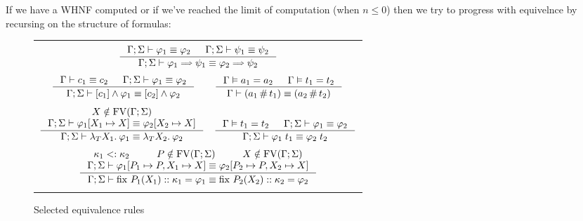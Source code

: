 \documentclass[english, mgr]{iithesis}
\newcommand{\fix}[3]{\ensuremath{\text{fix }#1(#2)\ofkind#3=}}\newcommand{\myatop}[2]{\ensuremath{\genfrac{}{}{0pt}{}{#1\hfill}{#2\hfill}}}
\begin{document}
\newpage

If we have a WHNF computed or if we've reached the limit of computation (when $ n \leqslant 0$) then we try to progress with equivelnce by recursing on the structure of formulas:
\begin{figure}[htbp]
  \centering
\begin{tabularx}{\textwidth}{|C|}
\hline \\ $
  \inference{
    \jgmnt[\Gamma; \Sigma]{\formphi_1 \equiv \formphi_2 } &
    \jgmnt[\Gamma; \Sigma]{\psi_1 \equiv \psi_2 }
    }{
    \jgmnt[\Gamma; \Sigma]{\formphi_1 \fImp \psi_1 \equiv \formphi_2 \fImp \psi_2 }
  }
$ \\ \\ $
  \inference{
    \jgmnt[\Gamma]{\constr_1 \equiv \constr_2 } &
    \jgmnt[\Gamma; \Sigma]{\formphi_1 \equiv \formphi_2 }
  }{
    \jgmnt[\Gamma; \Sigma]{\fCAnd{\constr_1}\formphi_1 \equiv \fCAnd{\constr_2}\formphi_2 }
  }
\qquad
  \inference{
    \cjgmnt[\Gamma]{\atomv_1 \ceq \atomv_2 } & \cjgmnt[\Gamma]{\term_1 \ceq \term_2 }
  }{
    \jgmnt[\Gamma]{(\atomv_1 \cfresh \term_1) \equiv (\atomv_2 \cfresh \term_2) }
  }
$ \\ \\ $
  \inference{
    \termv \notin \fv[\Gamma; \Sigma] \\
    \jgmnt[\Gamma; \Sigma]{\formphi_1[\termv_1 \mapsto \termv] \equiv \formphi_2[\termv_2 \mapsto \termv] }
    }{
    \jgmnt[\Gamma; \Sigma]{\fLamTerm{\termv_1}\formphi_1 \equiv \fLamTerm{\termv_2}\formphi_2 }
  }
  \quad
  \inference{
    \cjgmnt[\Gamma]{\term_1 \ceq \term_2} &
    \jgmnt[\Gamma; \Sigma]{\formphi_1 \equiv \formphi_2 }
    }{
    \jgmnt[\Gamma; \Sigma]{\formphi_1 \fAppTerm \term_1 \equiv \formphi_2 \fAppTerm \term_2 }
  }
$ \\ \\ $
  \inference{
    \kind_1 \subkind \kind_2 &
    P \notin \fv[\Gamma; \Sigma] & \termv \notin \fv[\Gamma; \Sigma] \\
    \jgmnt[\Gamma; \Sigma]{\formphi_1[P_1 \mapsto P, \termv_1 \mapsto \termv] \equiv \formphi_2[P_2 \mapsto P, \termv_2 \mapsto \termv] }
    }{
    \jgmnt[\Gamma; \Sigma]{\fix{P_1}{\termv_1}{\kind_1}\formphi_1 \equiv \fix{P_2}{\termv_2}{\kind_2}\formphi_2}
  }
$ \\ \\ \hline
\end{tabularx}
  \caption{Selected equivalence rules}
  \label{fig:compute}
\end{figure}
\end{document}
